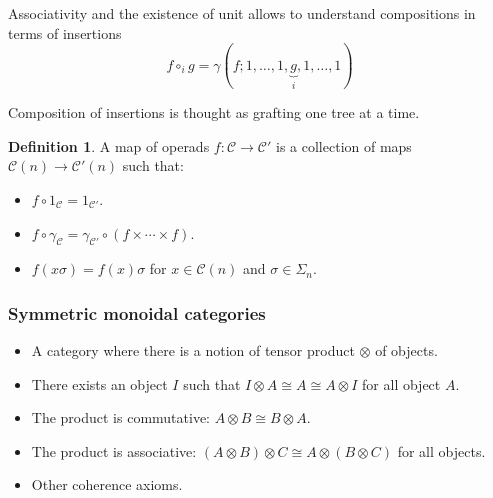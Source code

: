 \documentclass{beamer}
\theoremstyle{definition}
\newtheorem{defi}{Definition}
\newcommand{\CC}{\mathcal{C}}
\begin{document}
\begin{frame}
	Associativity and the existence of unit allows to understand compositions in terms of insertions $$f\circ_i g=\gamma(f;1,\dots, 1,\underbrace{g}_{i},1,\dots, 1)$$ \pause
	
	Composition of insertions is thought as grafting one tree at a time.
\end{frame}
\begin{frame}
	\begin{defi}
	 A map of operads $f:\mathcal{C}\to \mathcal{C}'$ is a collection of maps $\mathcal{C}(n)\to \mathcal{C}'(n)$ such that:
		\begin{itemize}
			\item<1->   $f\circ 1_\mathcal{C}=1_{\mathcal{C}'}$.
			\item<2->  $f\circ \gamma_\mathcal{C}=\gamma_{\mathcal{C}'}\circ (f\times\cdots\times f)$.
			\item<3->   $f(x\sigma)=f(x)\sigma$ for $x\in\CC(n)$ and $\sigma\in\Sigma_n$.
		\end{itemize}
	\end{defi}
	
	
\end{frame}
\begin{frame}
	\frametitle{Symmetric monoidal  categories}
	\begin{itemize}
		\item<1-> A category where there is a notion of tensor product $\otimes $ of objects.
		\item<2-> There exists an object $I$ such that $I\otimes A\cong A\cong A\otimes I$ for all object $A$.
		\item<3-> The product is commutative: $A\otimes B\cong B\otimes A$.
		\item<4-> The product is associative: $(A\otimes B)\otimes C\cong A\otimes (B\otimes C)$ for all objects.
		\item<5-> Other coherence axioms.
	\end{itemize}
	
\end{frame}
\end{document}
